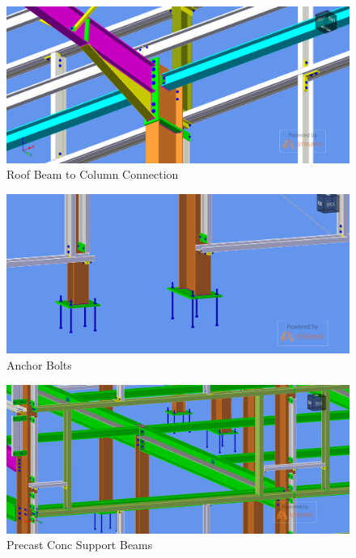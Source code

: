 \begin{figure}
	\centering
	\includegraphics[width=1.0\linewidth]{./images/4.png}
	\caption{Roof Beam to Column Connection}
	\label{fig:ass3img4}
\end{figure}

\begin{figure}
	\centering
	\includegraphics[width=1.0\linewidth]{./images/5.png}
	\caption{Anchor Bolts}
	\label{fig:ass3img5}
\end{figure}

\begin{figure}
	\centering
	\includegraphics[width=1.0\linewidth]{./images/6.png}
	\caption{Precast Conc Support Beams}
	\label{fig:ass3img6}
\end{figure}

